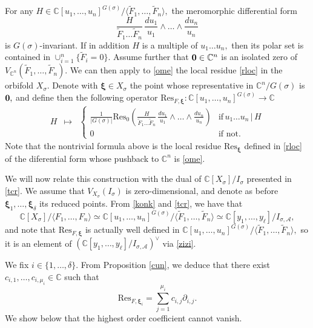 \documentclass[a4paper,11pt]{amsart}
\newcommand{\C}{\mathbb{C}}
\newcommand{\cA}{{\mathcal A}}
\newcommand{\bfxi}{{\boldsymbol{\xi}}}
\numberwithin{thm}{section}
\numberwithin{equation}{section}
\theoremstyle{definition}
\theoremstyle{plain}
\begin{document}
For any $H\in\C[u_1,\ldots, u_n]^{G(\sigma)}/\langle\tilde{F}_1,\ldots, \tilde{F}_n\rangle,$ 
the meromorphic differential form
\begin{equation}\label{ome}
\frac{H}{\tilde{F}_1\ldots \tilde{F}_n}\,\frac{du_1}{u_1}\wedge\ldots\wedge\frac{du_n}{u_n}
\end{equation}
is $G(\sigma)$-invariant. If in addition ${H}$ is a multiple of $u_1\ldots u_n,$ then its polar set is contained in $\cup_{i=1}^n\{\tilde{F}_i=0\}.$  Assume further that ${\bf0}\in\C^n$ is an isolated zero of $V_{\C^n}(\tilde{F}_1,\ldots, \tilde{F}_n)$. We can then apply to \eqref{ome} the local residue \eqref{rloc} in the orbifold $X_\sigma.$  Denote with $\bfxi\in X_\sigma$ the point whose representative in $\C^n/G(\sigma)$ is ${\bf0},$ and define then the following operator $\mbox{Res}_{F,\bfxi}: \C[u_1,\ldots, u_n]^{G(\sigma)} \to \C$
\begin{equation}\label{eq:resop}
\begin{array}{cccl}
 H & \mapsto & \left\{\begin{array}{cc}
\frac{1}{|G(\sigma)|}\mbox{Res}_{0} \left(\frac{H}{\tilde{F}_1\ldots \tilde{F}_n}\,\frac{du_1}{u_1}\wedge\ldots\wedge\frac{du_n}{u_n}\right) & \mbox{if} \,
u_1\ldots u_n \, | \, H\\
0 & \mbox{if not.}
\end{array}
 \right.
\end{array}
\end{equation}
Note that the nontrivial formula above  is the local residue $\mbox{Res}_\bfxi$ defined in \eqref{rloc} of the diferential form whose pushback to $\C^n$ is \eqref{ome}.


We will now relate  this construction with the dual of $\C[X_\sigma]/I_\sigma $ presented in \eqref{tcr}.
We assume  that
$V_{X_\sigma}(I_\sigma)$ is zero-dimensional, and denote as before $\bfxi_1,\ldots, \bfxi_\delta$ its reduced points. From \eqref{konk} and \eqref{tcr}, we have that
\begin{equation}\label{zizi}
\C[X_\sigma]/\langle F_1,\ldots, F_n\rangle\simeq \C[u_1,\ldots, u_n]^{G(\sigma)}/\langle \tilde{F}_1,\ldots, \tilde{F}_n\rangle\simeq \C[y_1,\ldots, y_\ell]/ I_{\sigma,\cA},
\end{equation}
and note that $\mbox{Res}_{F,\bfxi}$ is actually well defined in $\C[u_1,\ldots, u_n]^{G(\sigma)}/\langle \tilde{F}_1,\ldots, \tilde{F}_n\rangle,$ so it is an element of $(\C[y_1,\ldots, y_\ell]/ I_{\sigma,\cA})^\vee$ via \eqref{zizi}. 

We fix  $i\in\{1,\ldots, \delta\}.$ From Proposition \ref{cun}, we deduce that there exist $c_{i,1},\ldots, c_{i,\mu_i}\in\C$ such that
\begin{equation}\label{aunt}
\mbox{Res}_{F,\bfxi_i}=\sum_{j=1}^{\mu_i} c_{i,j}\partial_{i,j}.
\end{equation}
We show  below that the highest order coefficient cannot vanish.
\end{document}
